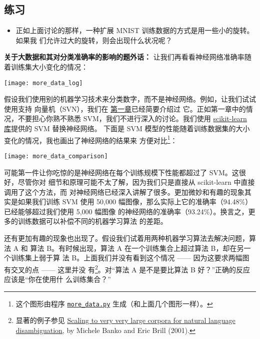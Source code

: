 \subsection*{练习}

\begin{itemize}
\item 正如上面讨论的那样，一种扩展 MNIST 训练数据的方式是用一些小的旋转。如果我
  们允许过大的旋转，则会出现什么状况呢？
\end{itemize}

\textbf{关于大数据和其对分类准确率的影响的题外话：} 让我们再看看神经网络准确率随
着训练集大小变化的情况：
\begin{center}
\texttt{[image: more\_data\_log]}
\end{center}

假设我们使用别的机器学习技术来分类数字，而不是神经网络。例如，让我们试试使用支持
向量机（SVN），我们在%
\hyperref[ch:UsingNeuralNetsToRecognizeHandwrittenDigits]{第一章}已经简要介绍过
它。正如第一章中的情况，不要担心你熟不熟悉 SVM，我们不进行深入的讨论。我们使用
\href{http://scikit-learn.org/stable/}{scikit-learn 库}提供的 SVM 替换神经网络。
下面是 SVM 模型的性能随着训练数据集的大小变化的情况，我也画出了神经网络的结果来
方便对比\footnote{这个图形由程序
  \href{https://github.com/mnielsen/neural-networks-and-deep-learning/blob/master/fig/more_data.py}{\lstinline!more_data.py!}
  生成（和上面几个图形一样）。}：
\begin{center}
\texttt{[image: more\_data\_comparison]}
\end{center}

可能第一件让你吃惊的是神经网络在每个训练规模下性能都超过了 SVM。这很好，尽管你对
细节和原理可能不太了解，因为我们只是直接从 scikit-learn 中直接调用了这个方法，而
对神经网络已经深入讲解了很多。更加微妙和有趣的现象其实是如果我们训练 SVM 使用
50,000 幅图像，那么实际上它的准确率（94.48\%）已经能够超过我们使用 5,000 幅图像
的神经网络的准确率（93.24\%）。换言之，更多的训练数据可以补偿不同的机器学习算法
的差距。

还有更加有趣的现象也出现了。假设我们试着用两种机器学习算法去解决问题，算法 A 和
算法 B。有时候出现，算法 A 在一个训练集合上超过算法 B，却在另一个训练集上弱于算
法 B。上面我们并没有看到这个情况 —— 因为这要求两幅图有交叉的点 —— 这里并没
有\footnote{显著的例子参见
  \href{http://dx.doi.org/10.3115/1073012.1073017}{Scaling to very very large
    corpora for natural language disambiguation}, by Michele Banko and Eric
  Brill (2001).}。对“算法 A 是不是要比算法 B 好？”正确的反应应该是“你在使用什
么训练集合？”

